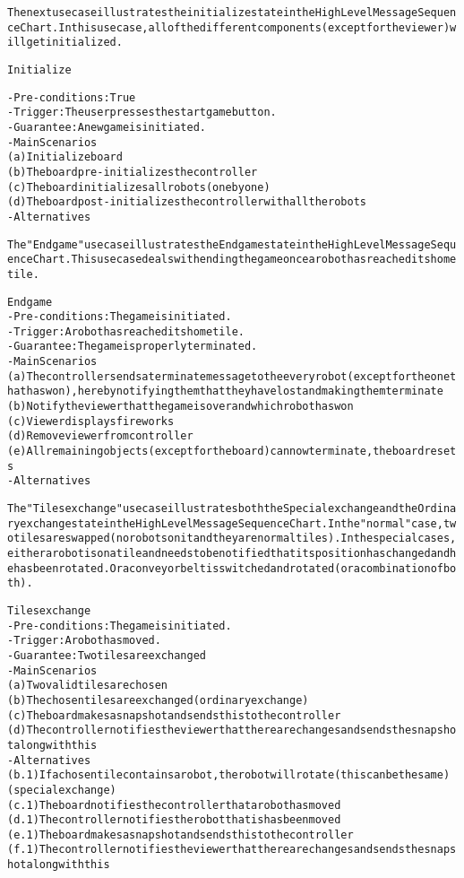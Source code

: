 \begin{alltt}
\rm
The next use case illustrates the initialize state in the High Level Message Sequence Chart. In this use case, all of the different components (except for the viewer) will get initialized.

Initialize

- Pre-conditions: True
- Trigger: The user presses the start game button.
- Guarantee: A new game is initiated.
- Main Scenarios
    (a) Initialize board
    (b) The board pre-initializes the controller
    (c) The board initializes all robots (one by one)
    (d) The board post-initializes the controller with all the robots
- Alternatives

The "End game" use case illustrates the End game state in the High Level Message Sequence Chart. This use case deals with ending the game once a robot has reached its home tile.

End game
- Pre-conditions: The game is initiated.
- Trigger:  A robot has reached its home tile.
- Guarantee: The game is properly terminated.
- Main Scenarios
    (a) The controller sends a terminate message to the every robot (except for the one that has won), hereby notifying them that they have lost and making them terminate
    (b) Notify the viewer that the game is over and which robot has won
    (c) Viewer displays fireworks
    (d) Remove viewer from controller
    (e) All remaining objects (except for the board) can now terminate, the board resets
- Alternatives

The "Tiles exchange" use case illustrates both the Special exchange and the Ordinary exchange state in the High Level Message Sequence Chart. In the "normal" case, two tiles are swapped (no robots on it and they are normal tiles). In the special cases, either a robot is on a tile and needs to be notified that its position has changed and he has been rotated. Or a conveyor belt is switched and rotated (or a combination of both).

Tiles exchange
- Pre-conditions: The game is initiated.
- Trigger:  A robot has moved.
- Guarantee: Two tiles are exchanged
- Main Scenarios
    (a) Two valid tiles are chosen
    (b) The chosen tiles are exchanged (ordinary exchange)
    (c) The board makes a snapshot and sends this to the controller
    (d) The controller notifies the viewer that there are changes and sends the snapshot along with this
- Alternatives
    (b.1) If a chosen tile contains a robot, the robot will rotate (this can be the same) (special exchange)
    (c.1) The board notifies the controller that a robot has moved
    (d.1) The controller notifies the robot that is has been moved
    (e.1) The board makes a snapshot and sends this to the controller
    (f.1) The controller notifies the viewer that there are changes and sends the snapshot along with this
    

\end{alltt}
